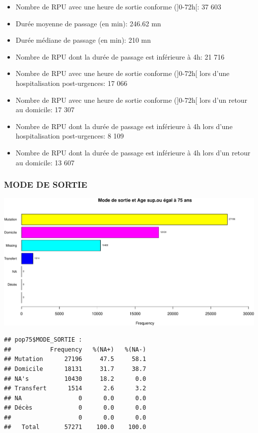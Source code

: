 \documentclass[]{article}
\begin{document}
\begin{itemize}
\item
  Nombre de RPU avec une heure de sortie conforme ({]}0-72h{[}: 37 603
\item
  Durée moyenne de passage (en min): 246.62 mn
\item
  Durée médiane de passage (en min): 210 mn
\item
  Nombre de RPU dont la durée de passage est inférieure à 4h: 21 716
\item
  Nombre de RPU avec une heure de sortie conforme ({]}0-72h{[} lors
  d'une hospitalisation post-urgences: 17 066
\item
  Nombre de RPU avec une heure de sortie conforme ({]}0-72h{[} lors d'un
  retour au domicile: 17 307
\item
  Nombre de RPU dont la durée de passage est inférieure à 4h lors d'une
  hospitalisation post-urgences: 8 109
\item
  Nombre de RPU dont la durée de passage est inférieure à 4h lors d'un
  retour au domicile: 13 607
\end{itemize}

\subsubsection{MODE DE SORTIE}\label{mode-de-sortie-1}

\includegraphics{Figs/sortie75-1.pdf}

\begin{verbatim}
## pop75$MODE_SORTIE : 
##           Frequency   %(NA+)   %(NA-)
## Mutation      27196     47.5     58.1
## Domicile      18131     31.7     38.7
## NA's          10430     18.2      0.0
## Transfert      1514      2.6      3.2
## NA                0      0.0      0.0
## Décès             0      0.0      0.0
##                   0      0.0      0.0
##   Total       57271    100.0    100.0
\end{verbatim}
\end{document}
